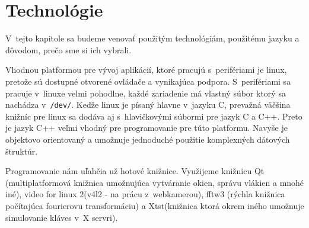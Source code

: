 \chapter{Technológie}\label{chap:tech}

V~tejto kapitole sa budeme venovať použitým technológiám, použitému jazyku a dôvodom, prečo sme si ich vybrali.
\bigskip

Vhodnou platformou pre vývoj aplikácií, ktoré pracujú s~perifériami je linux, pretože sú dostupné otvorené ovládače a vynikajúca podpora. S~perifériami sa pracuje v~linuxe velmi pohodlne, každé zariadenie má vlastný súbor ktorý sa nachádza v~{\tt /dev/}.
Keďže linux je písaný hlavne v~jazyku C, prevažná väčšina knižníc pre linux sa dodáva aj s~hlavičkovými súbormi pre jazyk C a C++.
Preto je jazyk C++ veľmi vhodný pre programovanie pre túto platformu. Navyše je objektovo orientovaný a umožnuje jednoduché použitie komplexných dátových štruktúr.

Programovanie nám uľahčia už hotové knižnice. Využijeme knižnicu Qt (multiplatformová knižnica umožnujúca vytváranie okien, správu vlákien a mnohé iné),
video for linux 2(v4l2 - na prácu z~webkamerou), fftw3 (rýchla knižnica počítajúca fourierovu transformáciu) a Xtst(knižnica ktorá okrem iného umožnuje simulovanie kláves v~X servri).
